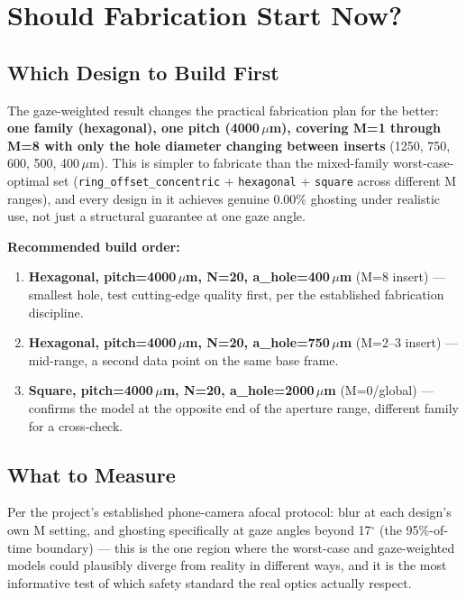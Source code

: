 \section{Should Fabrication Start Now?}


\subsection{Which Design to Build First}

The gaze-weighted result changes the practical fabrication plan for the
better: \textbf{one family (hexagonal), one pitch (4000\,$\mu$m), covering
M=1 through M=8 with only the hole diameter changing between inserts}
(1250, 750, 600, 500, 400\,$\mu$m). This is simpler to fabricate than the
mixed-family worst-case-optimal set (\texttt{ring\_offset\_concentric} +
\texttt{hexagonal} + \texttt{square} across different M ranges), and every
design in it achieves genuine 0.00\% ghosting under realistic use, not
just a structural guarantee at one gaze angle.

\textbf{Recommended build order:}
\begin{enumerate}
  \item \textbf{Hexagonal, pitch=4000\,$\mu$m, N=20, a\_hole=400\,$\mu$m}
  (M=8 insert) --- smallest hole, test cutting-edge quality first, per the
  established fabrication discipline.
  \item \textbf{Hexagonal, pitch=4000\,$\mu$m, N=20, a\_hole=750\,$\mu$m}
  (M=2--3 insert) --- mid-range, a second data point on the same base
  frame.
  \item \textbf{Square, pitch=4000\,$\mu$m, N=20, a\_hole=2000\,$\mu$m}
  (M=0/global) --- confirms the model at the opposite end of the aperture
  range, different family for a cross-check.
\end{enumerate}

\subsection{What to Measure}
Per the project's established phone-camera afocal protocol: blur at each
design's own M setting, and ghosting specifically at gaze angles beyond
17$^\circ$ (the 95\%-of-time boundary) --- this is the one region where
the worst-case and gaze-weighted models could plausibly diverge from
reality in different ways, and it is the most informative test of which
safety standard the real optics actually respect.


